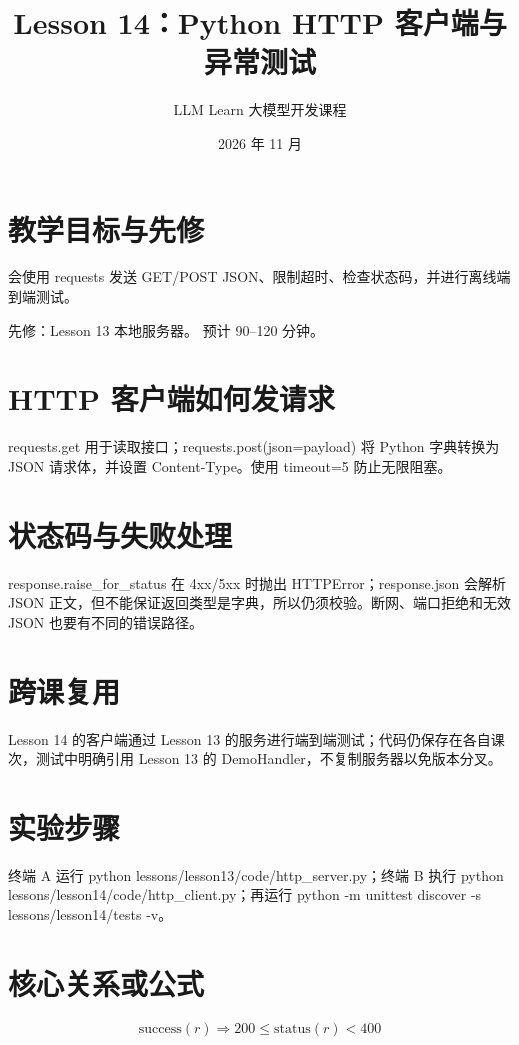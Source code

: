 \documentclass[UTF8,11pt,a4paper]{ctexart}
\begin{document}
\title{Lesson 14：Python HTTP 客户端与异常测试}
\author{LLM Learn 大模型开发课程}
\date{2026 年 11 月}
\maketitle
\tableofcontents
\newpage
\section{教学目标与先修}
会使用 requests 发送 GET/POST JSON、限制超时、检查状态码，并进行离线端到端测试。\par
先修：Lesson 13 本地服务器。 预计 90–120 分钟。\par
\section{HTTP 客户端如何发请求}
requests.get 用于读取接口；requests.post(json=payload) 将 Python 字典转换为 JSON 请求体，并设置 Content-Type。使用 timeout=5 防止无限阻塞。

\section{状态码与失败处理}
response.raise\_for\_status 在 4xx/5xx 时抛出 HTTPError；response.json 会解析 JSON 正文，但不能保证返回类型是字典，所以仍须校验。断网、端口拒绝和无效 JSON 也要有不同的错误路径。

\section{跨课复用}
Lesson 14 的客户端通过 Lesson 13 的服务进行端到端测试；代码仍保存在各自课次，测试中明确引用 Lesson 13 的 DemoHandler，不复制服务器以免版本分叉。

\section{实验步骤}
终端 A 运行 python lessons/lesson13/code/http\_server.py；终端 B 执行 python lessons/lesson14/code/http\_client.py；再运行 python -m unittest discover -s lessons/lesson14/tests -v。

\section{核心关系或公式}
\[
\mathrm{success}(r)\Longrightarrow 200\leq\mathrm{status}(r)<400
\]
\end{document}
